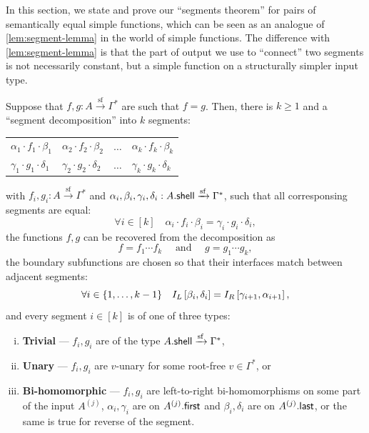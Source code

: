 In this section, we state and prove our ``segments theorem'' for pairs of semantically equal simple functions, which can be seen as an analogue of \cref{lem:segment-lemma} in the world of simple functions. The difference with \cref{lem:segment-lemma} is that the part of output we use to ``connect'' two segments is not necessarily constant, but a simple function on a structurally simpler input type.

\begin{theorem}\label{thm:segments-theorem}
    Suppose that $f,g : A \xrightarrow{\mathrm{sf}} \Gamma^*$ are such that $f = g$. Then, there is $k \geq 1$ and a ``segment decomposition'' into $k$ segments:
    \begin{center}
        \begin{tabular}{l|l|l|l}
            $\alpha_1 \cdot f_1 \cdot \beta_1$ & $\alpha_2 \cdot f_2 \cdot \beta_2$ & $\dots$ & $\alpha_k \cdot f_k \cdot \beta_k$ \\
            $\gamma_1 \cdot g_1 \cdot \delta_1$ & $\gamma_2 \cdot g_2 \cdot \delta_2$ & $\dots$ & $\gamma_k \cdot g_k \cdot \delta_k$
        \end{tabular}
    \end{center}
    with $f_i,g_i : A \xrightarrow{\mathrm{sf}} \Gamma^*$ and $\alpha_i,\beta_i,\gamma_i,\delta_i : A . \mathsf{shell} \xrightarrow{\mathrm{sf}} \Gamma^*$, such that all corresponsing segments are equal:
    \[
        \forall i \in [k] \quad \alpha_i \cdot f_i \cdot \beta_i = \gamma_i \cdot g_i \cdot \delta_i,
    \]
    the functions $f,g$ can be recovered from the decomposition as
    \[
        f = f_1 \cdots f_k \quad \text{ and } \quad g = g_1 \cdots g_k,
    \]
    the boundary subfunctions are chosen so that their interfaces match between adjacent segments:
    \[
        \forall i \in \{ 1, \dots, k-1 \} \quad I_L \left[ \beta_i, \delta_i \right] = I_R \left[ \gamma_{i+1}, \alpha_{i+1} \right],
    \]
    and every segment $i \in [k]$ is of one of three types:
    \begin{enumerate}[(i)]
        \item \textbf{Trivial} --- $f_i, g_i$ are of the type $A . \mathsf{shell} \xrightarrow{\mathrm{sf}} \Gamma^*$,
        \item \textbf{Unary} --- $f_i, g_i$ are $v$-unary for some root-free $v \in \Gamma^*$, or
        \item \textbf{Bi-homomorphic} --- $f_i, g_i$ are left-to-right bi-homomorphisms on some part of the input $A^{(j)}$,  $\alpha_i, \gamma_i$ are on $A^{(j)} . \mathsf{first}$ and $\beta_i, \delta_i$ are on $A^{(j)} . \mathsf{last}$, or the same is true for reverse of the segment.
    \end{enumerate}
\end{theorem}

